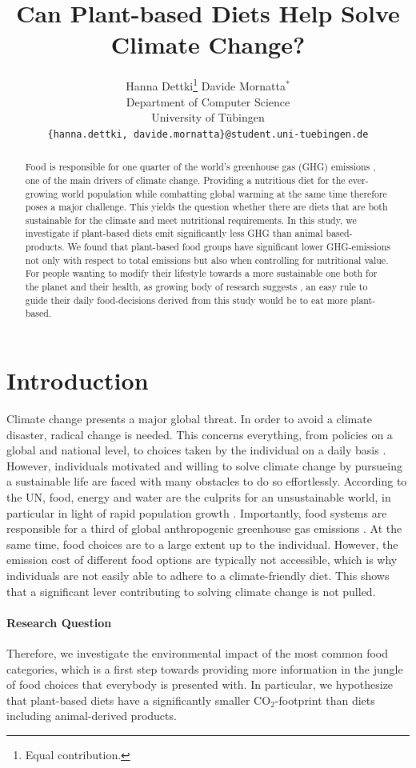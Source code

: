 \documentclass{article}
\title{Can Plant-based Diets Help Solve Climate Change?}
\author{%
  Hanna Dettki\thanks{Equal contribution.}\hspace{4em} Davide Mornatta$^{*}$  \\[0.5em]
  Department of Computer Science\\
  University of Tübingen\\
  \texttt{\{hanna.dettki, davide.mornatta\}@student.uni-tuebingen.de}
}
\begin{document}
\maketitle

\begin{abstract}
  Food is responsible for one quarter of the world's greenhouse gas (GHG) emissions \cite{Poore2018}, one of the main drivers of climate change. Providing a nutritious diet for the ever-growing world population while combatting global warming at the same time therefore poses a major challenge. This yields the question whether there are diets that are both sustainable for the climate and meet  nutritional requirements. In this study, we investigate if plant-based diets  emit significantly less GHG than animal based-products. We found  that plant-based food groups have significant lower GHG-emissions not only with respect to total emissions but also when controlling for nutritional value. For people wanting to  modify their lifestyle towards a more sustainable one both for the planet and their health, as growing body of research suggests \cite{WHO2021}, an easy rule to guide their daily food-decisions derived from this study would be to eat more plant-based.
\end{abstract}

\section{Introduction}

Climate change presents a major global threat. In order to avoid a climate disaster, radical change is needed. This concerns everything, from policies on a global and national level, to choices taken by the individual on a daily basis \cite{IPCC}. 
However, individuals motivated and willing to solve climate change by pursueing a sustainable life are faced with many obstacles to do so effortlessly. According to the UN, food, energy and water are the culprits for an unsustainable world, in particular in light of rapid population growth \cite{Ritchie2020}.
 Importantly, food systems are responsible for a third of global anthropogenic greenhouse gas emissions \cite{Crippa2021}. At the same time, food choices are to a large extent up to the individual.  However,  the emission cost of different food options are  typically not accessible, which is why individuals are  not easily able to adhere to  a climate-friendly diet. This shows that a significant lever contributing to solving climate change is not pulled.
\paragraph*{Research Question}
Therefore, we investigate the environmental impact of the most common food categories, which is a first step towards  providing more information in the jungle of food choices that everybody is presented with. In particular, we hypothesize that  plant-based diets  have a significantly smaller CO$_2$-footprint than  diets including animal-derived products. %
\end{document}
